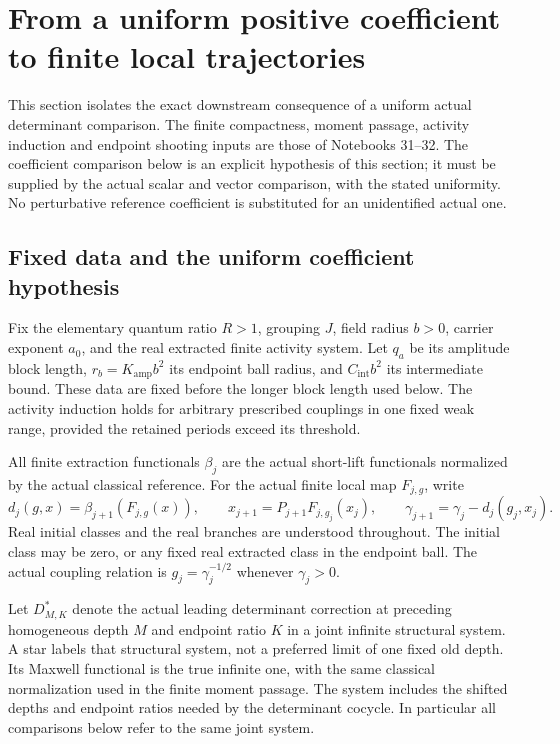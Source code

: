 \section{From a uniform positive coefficient to finite local trajectories}
\label{lpd-section}

This section isolates the exact downstream consequence of a uniform
actual determinant comparison. The finite compactness, moment passage,
activity induction and endpoint shooting inputs are those of
Notebooks 31--32. The coefficient comparison below is an explicit
hypothesis of this section; it must be supplied by the actual scalar
and vector comparison, with the stated uniformity. No perturbative
reference coefficient is substituted for an unidentified actual one.

\subsection{Fixed data and the uniform coefficient hypothesis}
\label{lpd-data}

Fix the elementary quantum ratio \(R>1\), grouping \(J\), field
radius \(b>0\), carrier exponent \(a_0\), and the real extracted
finite activity system. Let \(q_a\) be its amplitude block length,
\(r_b=K_{\mathrm{amp}}b^2\) its endpoint ball radius, and
\(C_{\mathrm{int}}b^2\) its intermediate bound. These data are fixed
before the longer block length used below. The activity induction
holds for arbitrary prescribed couplings in one fixed weak range,
provided the retained periods exceed its threshold.

All finite extraction functionals \(\beta_j\) are the actual
short-lift functionals normalized by the actual classical reference.
For the actual finite local map \(F_{j,g}\), write
\begin{equation}
 d_j(g,x)=\beta_{j+1}(F_{j,g}(x)),\qquad
 x_{j+1}=P_{j+1}F_{j,g_j}(x_j),\qquad
 \gamma_{j+1}=\gamma_j-d_j(g_j,x_j).
 \label{lpd-updates}
\end{equation}
Real initial classes and the real branches are understood throughout.
The initial class may be zero, or any fixed real extracted class in
the endpoint ball. The actual coupling relation is
\(g_j=\gamma_j^{-1/2}\) whenever \(\gamma_j>0\).

Let \(D_{M,K}^{*}\) denote the actual leading determinant correction
at preceding homogeneous depth \(M\) and endpoint ratio \(K\) in a
joint infinite structural system. A star labels that structural
system, not a preferred limit of one fixed old depth. Its Maxwell
functional is the true infinite one, with the same classical
normalization used in the finite moment passage. The system includes
the shifted depths and endpoint ratios needed by the determinant
cocycle. In particular all comparisons below refer to the same
joint system.

